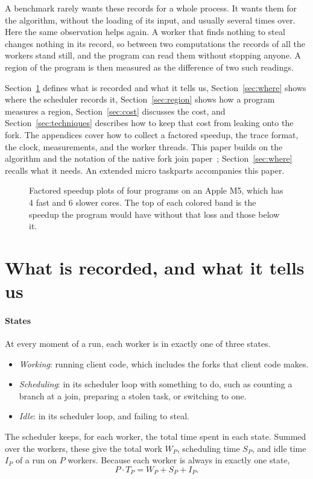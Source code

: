 \documentclass[sigplan,nonacm]{acmart}
\begin{document}
A benchmark rarely wants these records for a whole process.
%
It wants them for the algorithm, without the loading of its input, and
usually several times over.
%
Here the same observation helps again.
%
A worker that finds nothing to steal changes nothing in its record, so
between two computations the records of all the workers stand still,
and the program can read them without stopping anyone.
%
A region of the program is then measured as the difference of two such
readings.

Section~\ref{sec:what} defines what is recorded and what it tells us,
Section~\ref{sec:where} shows where the scheduler records it,
Section~\ref{sec:region} shows how a program measures a region,
Section~\ref{sec:cost} discusses the cost, and
Section~\ref{sec:techniques} describes how to keep that cost from
leaking onto the fork.
%
The appendices cover how to collect a factored speedup, the trace
format, the clock, measurements, and the worker threads.
%
This paper builds on the algorithm and the notation of the native fork
join paper~\cite{nativeforkjoin}; Section~\ref{sec:where} recalls what
it needs.
%
An extended micro taskparts accompanies this paper.

\begin{figure}
\centering
{}\hfill
{}\hfill
{}\hfill
{}

\smallskip
\factoredlegend
\caption{Factored speedup plots of four programs on an Apple M5, which
  has 4 fast and 6 slower cores.
  The top of each colored band is the speedup the program would have
  without that loss and those below it.}
\label{fig:factored}
\end{figure}

\section{What is recorded, and what it tells us}
\label{sec:what}

\paragraph{States}
%
At every moment of a run, each worker is in exactly one of three
states.
%
\begin{itemize}[leftmargin=*]
\item \emph{Working}: running client code, which includes the forks
  that client code makes.
\item \emph{Scheduling}: in its scheduler loop with something to do,
  such as counting a branch at a join, preparing a stolen task, or
  switching to one.
\item \emph{Idle}: in its scheduler loop, and failing to steal.
\end{itemize}
%
The scheduler keeps, for each worker, the total time spent in each
state.
%
Summed over the workers, these give the total work $W_P$, scheduling
time $S_P$, and idle time $I_P$ of a run on $P$ workers.
%
Because each worker is always in exactly one state,
\[ P \cdot T_P = W_P + S_P + I_P. \]
\end{document}
